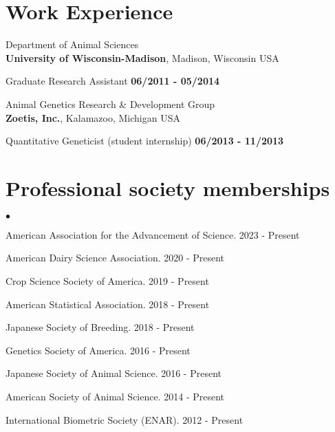 \documentclass[margin,line,10pt]{res}
\newenvironment{list2}{
  \begin{list}{$\bullet$}{%
      \setlength{\itemsep}{0in}
      \setlength{\parsep}{0in} \setlength{\parskip}{0in}
      \setlength{\topsep}{0in} \setlength{\partopsep}{0in} 
      \setlength{\leftmargin}{0.2in}}}{\end{list}}
\begin{document}
\begin{resume}
  


\vspace{0.4cm}
\section{\sc Work \phantom{1cm} Experience}
Department of Animal Sciences\\
{\bf University of Wisconsin-Madison}, Madison, Wisconsin USA
\vspace{-.35cm}

Graduate Research Assistant   \hfill {\bf 06/2011 - 05/2014}\\
\vspace{-.4cm}

Animal Genetics Research \& Development  Group \\
{\bf Zoetis, Inc.}, Kalamazoo, Michigan USA

\vspace{-.35cm}

Quantitative Geneticist (student internship)   \hfill {\bf 06/2013 - 11/2013}\\








\vspace{0.5cm}
\section{\sc Professional society memberships}
\begin{list2}
 

  \item American Association for the Advancement of Science. 2023 - Present
  \vspace{0.3cm}
  \item American Dairy Science Association. 2020 - Present
    \vspace{0.3cm}
  \item Crop Science Society of America. 2019 - Present
    \vspace{0.3cm}
  \item American Statistical Association. 2018 - Present
    \vspace{0.3cm}
  \item  Japanese Society of Breeding. 2018 - Present
      \vspace{0.3cm}
\item  Genetics Society of America. 2016 - Present
  \vspace{0.3cm}
\item  Japanese Society of Animal Science. 2016 - Present
  \vspace{0.3cm}
\item American Society of Animal Science. 2014 - Present
  \vspace{0.3cm}
\item International Biometric Society (ENAR). 2012 - Present
\end{list2}



\end{resume}
\end{document}
